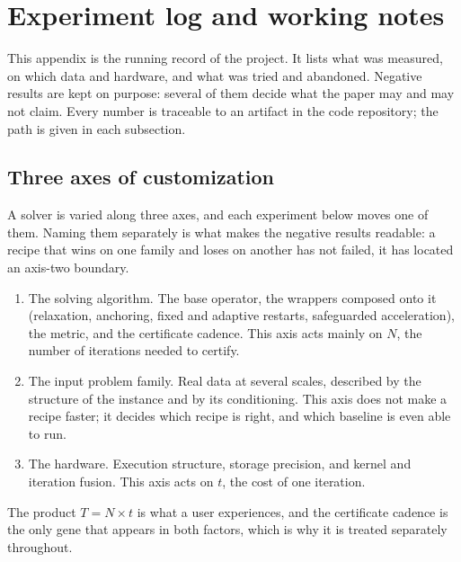 \section{Experiment log and working notes}
\label{app:log}

This appendix is the running record of the project. It lists what was
measured, on which data and hardware, and what was tried and abandoned.
Negative results are kept on purpose: several of them decide what the paper
may and may not claim. Every number is traceable to an artifact in the code
repository; the path is given in each subsection.

\subsection{Three axes of customization}
\label{app:log:axes}

A solver is varied along three axes, and each experiment below moves one of
them. Naming them separately is what makes the negative results readable: a
recipe that wins on one family and loses on another has not failed, it has
located an axis-two boundary.

\begin{enumerate}
\item The solving algorithm. The base operator, the wrappers composed onto it
 (relaxation, anchoring, fixed and adaptive restarts, safeguarded
 acceleration), the metric, and the certificate cadence. This axis acts
 mainly on $N$, the number of iterations needed to certify.
\item The input problem family. Real data at several scales, described by the
 structure of the instance and by its conditioning. This axis does not make a
 recipe faster; it decides which recipe is right, and which baseline is even
 able to run.
\item The hardware. Execution structure, storage precision, and kernel and
 iteration fusion. This axis acts on $t$, the cost of one iteration.
\end{enumerate}

The product $T = N \times t$ is what a user experiences, and the certificate
cadence is the only gene that appears in both factors, which is why it is
treated separately throughout.

